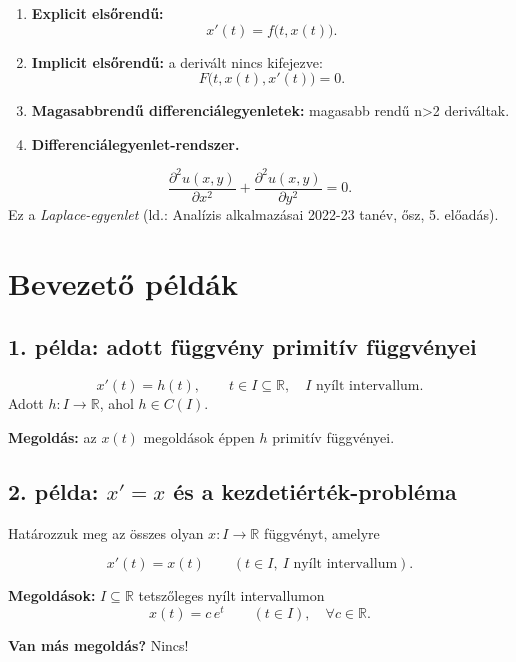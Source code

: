 \begin{enumerate}[label=\arabic*)]
\item \textbf{Explicit elsőrendű:}
\[
 x'(t)=f\bigl(t,x(t)\bigr).
\]
\item \textbf{Implicit elsőrendű:} a derivált nincs kifejezve:
\[
 F\bigl(t,x(t),x'(t)\bigr)=0.
\]
\item \textbf{Magasabbrendű differenciálegyenletek:} magasabb rendű n>2 deriváltak.
\item \textbf{Differenciálegyenlet-rendszer.}
\end{enumerate}

\[
 \frac{\partial^2 u(x,y)}{\partial x^2}
 +\frac{\partial^2 u(x,y)}{\partial y^2}=0.
\]
Ez a \emph{Laplace-egyenlet} (ld.: Analízis alkalmazásai 2022-23 tanév, ősz, 5. előadás).


\section{Bevezető példák}

\subsection*{1. példa: adott függvény primitív függvényei}
\begin{matbox}
\[
 \boxed{x'(t)=h(t)},\qquad t\in I\subseteq\mathbb R,
 \quad I\text{ nyílt intervallum}.
\]
Adott $h\colon I\to\mathbb R$, ahol $h\in C(I)$.
\end{matbox}

\textbf{Megoldás:} az $x(t)$ megoldások éppen $h$ primitív függvényei.

\subsection*{2. példa: $x'=x$ és a kezdetiérték-probléma}

Határozzuk meg az összes olyan $x\colon I\to\mathbb R$ függvényt, amelyre
\begin{matbox}
\[
 \boxed{x'(t)=x(t)}\qquad (t\in I,\ I\text{ nyílt intervallum}).
\]
\end{matbox}

\textbf{Megoldások:} $I\subseteq\mathbb R$ tetszőleges nyílt intervallumon
\[
 \boxed{x(t)=c\,e^t}\qquad (t\in I),\quad \forall c\in\mathbb R.
\]

\textbf{Van más megoldás?} Nincs!

